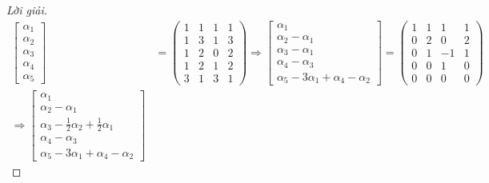 \documentclass[class=linear-algebra,crop=false]{standalone}
\begin{document}
\begin{proof}[Lời giải]
    \begin{align*}
        \begin{bmatrix}
            \alpha_{1} \\
            \alpha_{2} \\
            \alpha_{3} \\
            \alpha_{4} \\
            \alpha_{5}
        \end{bmatrix}                                           & =
        \begin{pmatrix}
            1 & 1 & 1 & 1 \\
            1 & 3 & 1 & 3 \\
            1 & 2 & 0 & 2 \\
            1 & 2 & 1 & 2 \\
            3 & 1 & 3 & 1
        \end{pmatrix}
        \Longrightarrow
        \begin{bmatrix}
            \alpha_{1}            \\
            \alpha_{2}-\alpha_{1} \\
            \alpha_{3}-\alpha_{1} \\
            \alpha_{4}-\alpha_{3} \\
            \alpha_{5}-3\alpha_{1}+\alpha_{4}-\alpha_{2}
        \end{bmatrix}=
        \begin{pmatrix}
            1 & 1 & 1  & 1 \\
            0 & 2 & 0  & 2 \\
            0 & 1 & -1 & 1 \\
            0 & 0 & 1  & 0 \\
            0 & 0 & 0  & 0
        \end{pmatrix}                                              \\
        \Longrightarrow
        \begin{bmatrix}
            \alpha_{1}                                             \\
            \alpha_{2}-\alpha_{1}                                  \\
            \alpha_{3}-\frac{1}{2}\alpha_{2}+\frac{1}{2}\alpha_{1} \\
            \alpha_{4} - \alpha_{3}                                \\
            \alpha_{5} - 3\alpha_{1} + \alpha_{4} - \alpha_{2}

\end{bmatrix}
\end{align*}
\end{proof}
\end{document}
